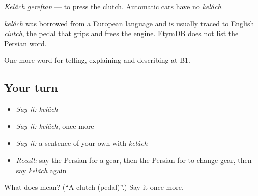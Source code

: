 \emph{Kelâch gereftan} — to press the clutch. Automatic cars have no \emph{kelâch}.

\begin{cousinweb}
\emph{kelâch} was borrowed from a European language and is usually traced to English \emph{clutch}, the pedal that grips and frees the engine. EtymDB does not list the Persian word.
\end{cousinweb}

\begin{grammarlens}[title={What you've built}]
One more word for telling, explaining and describing at B1.
\end{grammarlens}

\subsection*{Your turn}
\begin{itemize}
\raggedright
  \item \emph{Say it:} \emph{kelâch}
  \item \emph{Say it:} \emph{kelâch}, once more
  \item \emph{Say it:} a sentence of your own with \emph{kelâch}
  \item \emph{Recall:} say the Persian for a gear, then the Persian for to change gear, then say \emph{kelâch} again
\end{itemize}

\begin{tcolorbox}[breakable,colback=teal!4,colframe=teal!35!black,title={Before you move on}]
What does  mean? (\textquotedblleft{}A clutch (pedal)\textquotedblright{}.) Say it once more.
\end{tcolorbox}
